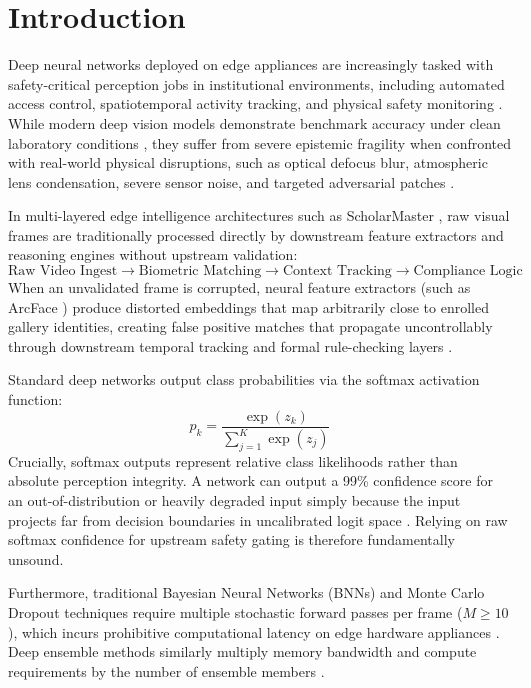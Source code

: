 \documentclass[conference]{IEEEtran}
\begin{document}
\section{Introduction}
Deep neural networks deployed on edge appliances are increasingly tasked with safety-critical perception jobs in institutional environments, including automated access control, spatiotemporal activity tracking, and physical safety monitoring \cite{b1, b2, b3}. While modern deep vision models demonstrate benchmark accuracy under clean laboratory conditions \cite{b4, b5}, they suffer from severe epistemic fragility when confronted with real-world physical disruptions, such as optical defocus blur, atmospheric lens condensation, severe sensor noise, and targeted adversarial patches \cite{b6, b7}.

In multi-layered edge intelligence architectures such as ScholarMaster \cite{b1}, raw visual frames are traditionally processed directly by downstream feature extractors and reasoning engines without upstream validation:
\begin{equation}
\text{Raw Video Ingest} \longrightarrow \text{Biometric Matching} \longrightarrow \text{Context Tracking} \longrightarrow \text{Compliance Logic}
\end{equation}
When an unvalidated frame is corrupted, neural feature extractors (such as ArcFace \cite{b8}) produce distorted embeddings that map arbitrarily close to enrolled gallery identities, creating false positive matches that propagate uncontrollably through downstream temporal tracking and formal rule-checking layers \cite{b9}.

Standard deep networks output class probabilities via the softmax activation function:
\begin{equation}
p_k = \frac{\exp(z_k)}{\sum_{j=1}^K \exp(z_j)}
\end{equation}
Crucially, softmax outputs represent relative class likelihoods rather than absolute perception integrity. A network can output a 99\% confidence score for an out-of-distribution or heavily degraded input simply because the input projects far from decision boundaries in uncalibrated logit space \cite{b10, b11}. Relying on raw softmax confidence for upstream safety gating is therefore fundamentally unsound.

Furthermore, traditional Bayesian Neural Networks (BNNs) and Monte Carlo Dropout techniques require multiple stochastic forward passes per frame ($M \ge 10$), which incurs prohibitive computational latency on edge hardware appliances \cite{b14, b15}. Deep ensemble methods similarly multiply memory bandwidth and compute requirements by the number of ensemble members \cite{b16}.
\end{document}
